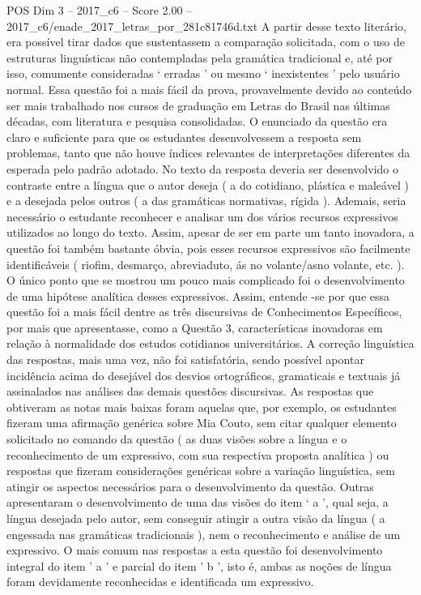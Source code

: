 \begin{textsample}{POS Dim 3 – 2017\_c6 – Score 2.00 – 2017\_c6/enade\_2017\_letras\_por\_281c81746d.txt}
A partir desse texto literário, era possível tirar dados que sustentassem a comparação solicitada, com o uso de estruturas linguísticas não contempladas pela gramática tradicional e, até por isso, comumente consideradas ‘ erradas ’ ou mesmo ‘ inexistentes ’ pelo usuário normal.
Essa questão foi a mais fácil da prova, provavelmente devido ao conteúdo ser mais trabalhado nos cursos de graduação em Letras do Brasil nas últimas décadas, com literatura e pesquisa consolidadas.
O enunciado da questão era claro e suficiente para que os estudantes desenvolvessem a resposta sem problemas, tanto que não houve índices relevantes de interpretações diferentes da esperada pelo padrão adotado.
No texto da resposta deveria ser desenvolvido o contraste entre a língua que o autor deseja ( a do cotidiano, plástica e maleável ) e a desejada pelos outros ( a das gramáticas normativas, rígida ).
Ademais, seria necessário o estudante reconhecer e analisar um dos vários recursos expressivos utilizados ao longo do texto.
Assim, apesar de ser em parte um tanto inovadora, a questão foi também bastante óbvia, pois esses recursos expressivos são facilmente identificáveis ( riofim, desmarço, abreviaduto, ás no volante/asno volante, etc. ).
O único ponto que se mostrou um pouco mais complicado foi o desenvolvimento de uma hipótese analítica desses expressivos.
Assim, entende -se por que essa questão foi a mais fácil dentre as três discursivas de Conhecimentos Específicos, por mais que apresentasse, como a Questão 3, características inovadoras em relação à normalidade dos estudos cotidianos universitários.
A correção linguística das respostas, mais uma vez, não foi satisfatória, sendo possível apontar incidência acima do desejável dos desvios ortográficos, gramaticais e textuais já assinalados nas análises das demais questões discursivas.
As respostas que obtiveram as notas mais baixas foram aquelas que, por exemplo, os estudantes fizeram uma afirmação genérica sobre Mia Couto, sem citar qualquer elemento solicitado no comando da questão ( as duas visões sobre a língua e o reconhecimento de um expressivo, com sua respectiva proposta analítica ) ou respostas que fizeram considerações genéricas sobre a variação linguística, sem atingir os aspectos necessários para o desenvolvimento da questão.
Outras apresentaram o desenvolvimento de uma das visões do item ‘ a ’, qual seja, a língua desejada pelo autor, sem conseguir atingir a outra visão da língua ( a engessada nas gramáticas tradicionais ), nem o reconhecimento e análise de um expressivo.
O mais comum nas respostas a esta questão foi desenvolvimento integral do item ' a ' e parcial do item ' b ', isto é, ambas as noções de língua foram devidamente reconhecidas e identificada um expressivo.

\end{textsample}
